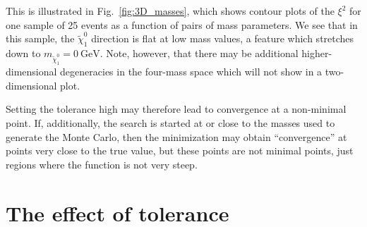 \documentclass[twoside,english]{uiofysmaster}
\begin{document}
This is illustrated in Fig.\ \ref{fig:3D_masses}, which shows contour plots of the $\xi^2$ for one sample of 25 events as a function of pairs of mass parameters. We see that in this sample, the $\tilde \chi_1^0$ direction is flat at low mass values, a feature which stretches down to $m_{\tilde \chi_1^0}=0~\mathrm{GeV}$. Note, however, that there may be additional higher-dimensional degeneracies in the four-mass space which will not show in a two-dimensional plot.

Setting the tolerance high may therefore lead to convergence at a non-minimal point. If, additionally, the search is started at or close to the masses used to generate the Monte Carlo, then the minimization may obtain ``convergence'' at points very close to the true value, but these points are not minimal points, just regions where the function is not very steep.

\section{The effect of tolerance}
\end{document}
